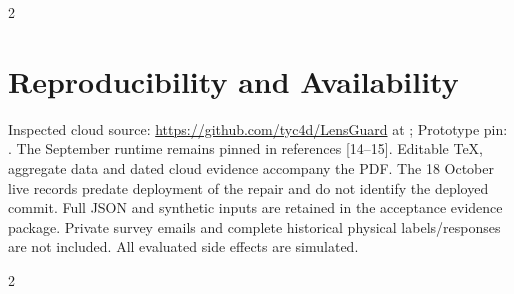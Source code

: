 \begin{multicols}{2}
\section*{Reproducibility and Availability}
Inspected cloud source: \url{https://github.com/tyc4d/LensGuard} at ; Prototype pin: . The September runtime remains pinned in references [14--15]. Editable TeX, aggregate data and dated cloud evidence accompany the PDF. The 18 October live records predate deployment of the repair and do not identify the deployed commit. Full JSON and synthetic inputs are retained in the acceptance evidence package. Private survey emails and complete historical physical labels/responses are not included. All evaluated side effects are simulated.
\end{multicols}

\begin{multicols}{2}
{\fontsize{7.7}{9.2}\selectfont
}
\end{multicols}
